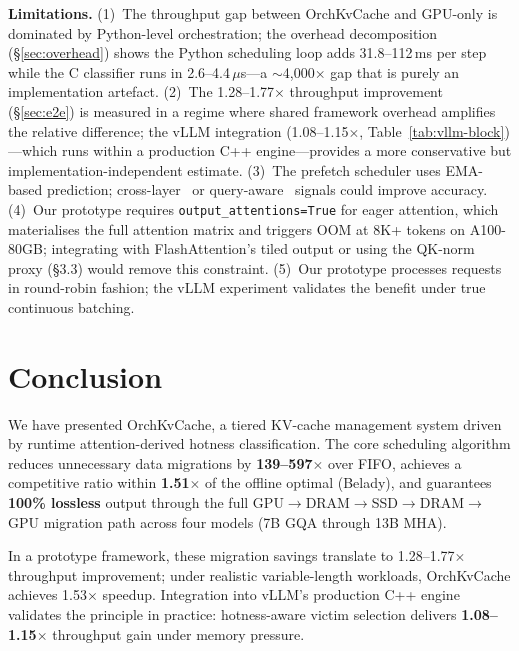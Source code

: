 \documentclass[conference]{IEEEtran}
\begin{document}
\textbf{Limitations.} (1)~The throughput gap between OrchKvCache and GPU-only is dominated by Python-level orchestration; the overhead decomposition (\S\ref{sec:overhead}) shows the Python scheduling loop adds 31.8--112\,ms per step while the C classifier runs in 2.6--4.4\,$\mu$s---a ${\sim}$4{,}000$\times$ gap that is purely an implementation artefact.  (2)~The 1.28--1.77$\times$ throughput improvement (\S\ref{sec:e2e}) is measured in a regime where shared framework overhead amplifies the relative difference; the vLLM integration (1.08--1.15$\times$, Table~\ref{tab:vllm-block})---which runs within a production C++ engine---provides a more conservative but implementation-independent estimate.  (3)~The prefetch scheduler uses EMA-based prediction; cross-layer~\cite{infinigen} or query-aware~\cite{quest} signals could improve accuracy.  (4)~Our prototype requires \texttt{output\_attentions=True} for eager attention, which materialises the full attention matrix and triggers OOM at 8K+ tokens on A100-80GB; integrating with FlashAttention's tiled output or using the QK-norm proxy (\S3.3) would remove this constraint.  (5)~Our prototype processes requests in round-robin fashion; the vLLM experiment validates the benefit under true continuous batching.

\section{Conclusion}

We have presented OrchKvCache, a tiered KV-cache management system driven by runtime attention-derived hotness classification. The core scheduling algorithm reduces unnecessary data migrations by \textbf{139--597$\times$} over FIFO, achieves a competitive ratio within \textbf{1.51$\times$} of the offline optimal (Belady), and guarantees \textbf{100\% lossless} output through the full GPU$\to$DRAM$\to$SSD$\to$DRAM$\to$GPU migration path across four models (7B GQA through 13B MHA).

In a prototype framework, these migration savings translate to 1.28--1.77$\times$ throughput improvement; under realistic variable-length workloads, OrchKvCache achieves 1.53$\times$ speedup. Integration into vLLM's production C++ engine validates the principle in practice: hotness-aware victim selection delivers \textbf{1.08--1.15$\times$} throughput gain under memory pressure.
\end{document}
